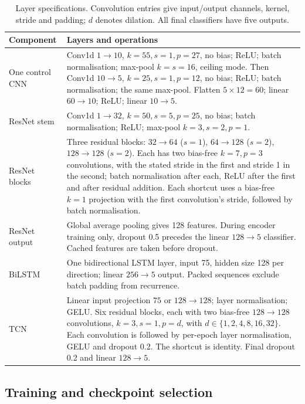 \documentclass[10pt,a4paper]{article}
\begin{document}
\begin{table}[H]
\centering\small
\caption{Layer specifications. Convolution entries give input/output channels, kernel, stride and
padding; $d$ denotes dilation. All final classifiers have five outputs.}
\label{tab:sup_architecture}
\begin{tabularx}{\textwidth}{p{2.5cm}X}
\toprule
Component & Layers and operations \\
\midrule
One control CNN & Conv1d $1\!\to\!10$, $k=55,s=1,p=27$, no bias; ReLU; batch
normalisation; max-pool $k=s=16$, ceiling mode. Then Conv1d $10\!\to\!5$,
$k=25,s=1,p=12$, no bias; ReLU; batch normalisation; the same max-pool.
Flatten $5\times12=60$; linear $60\!\to\!10$; ReLU; linear $10\!\to\!5$. \\
ResNet stem & Conv1d $1\!\to\!32$, $k=50,s=5,p=25$, no bias; batch normalisation;
ReLU; max-pool $k=3,s=2,p=1$. \\
ResNet blocks & Three residual blocks: $32\!\to\!64$ ($s=1$), $64\!\to\!128$
($s=2$), $128\!\to\!128$ ($s=2$). Each has two bias-free $k=7,p=3$ convolutions,
with the stated stride in the first and stride 1 in the second; batch normalisation after each,
ReLU after the first and after residual addition. Each shortcut uses a bias-free $k=1$ projection
with the first convolution's stride, followed by batch normalisation. \\
ResNet output & Global average pooling gives 128 features. During encoder training only,
dropout 0.5 precedes the linear $128\!\to\!5$ classifier. Cached features are taken before dropout. \\
BiLSTM & One bidirectional LSTM layer, input 75, hidden size 128 per direction;
linear $256\!\to\!5$ output. Packed sequences exclude batch padding from recurrence. \\
TCN & Linear input projection $75$ or $128\!\to\!128$; layer normalisation; GELU.
Six residual blocks, each with two bias-free $128\!\to\!128$ convolutions,
$k=3,s=1,p=d$, with $d\in\{1,2,4,8,16,32\}$. Each convolution is followed by
per-epoch layer normalisation, GELU and dropout 0.2. The shortcut is identity.
Final dropout 0.2 and linear $128\!\to\!5$. \\
\bottomrule
\end{tabularx}
\end{table}

\subsection*{Training and checkpoint selection}
\end{document}
